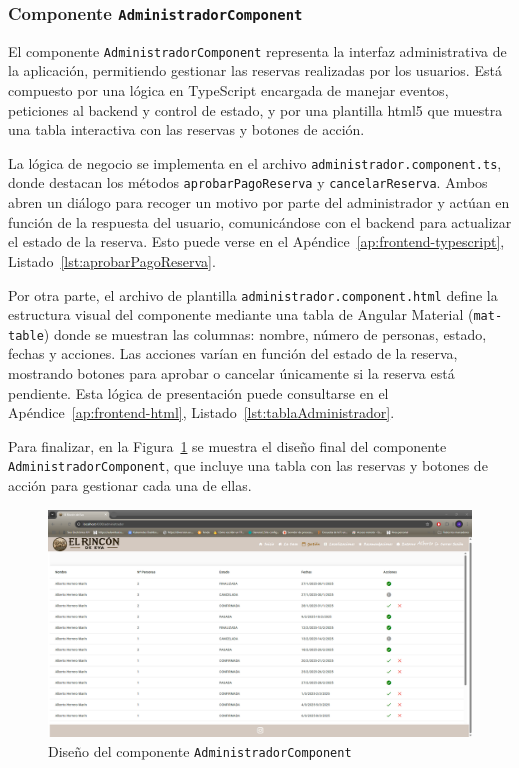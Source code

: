 \subsubsection{Componente \texttt{AdministradorComponent}}

El componente \texttt{AdministradorComponent} representa la interfaz administrativa de la aplicación, permitiendo gestionar las reservas realizadas por los usuarios. Está compuesto por una lógica en TypeScript encargada de manejar eventos, peticiones al backend y control de estado, y por una plantilla \gls{html5} que muestra una tabla interactiva con las reservas y botones de acción.

La lógica de negocio se implementa en el archivo \texttt{administrador.component.ts}, donde destacan los métodos \texttt{aprobarPagoReserva} y \texttt{cancelarReserva}. Ambos abren un diálogo para recoger un motivo por parte del administrador y actúan en función de la respuesta del usuario, comunicándose con el backend para actualizar el estado de la reserva. Esto puede verse en el Apéndice~\ref{ap:frontend-typescript}, Listado~\ref{lst:aprobarPagoReserva}.

Por otra parte, el archivo de plantilla \texttt{administrador.component.html} define la estructura visual del componente mediante una tabla de Angular Material (\texttt{mat-table}) donde se muestran las columnas: nombre, número de personas, estado, fechas y acciones. Las acciones varían en función del estado de la reserva, mostrando botones para aprobar o cancelar únicamente si la reserva está pendiente. Esta lógica de presentación puede consultarse en el Apéndice~\ref{ap:frontend-html}, Listado~\ref{lst:tablaAdministrador}.

Para finalizar, en la Figura~\ref{fig:administrador_component} se muestra el diseño final del componente \\ \texttt{AdministradorComponent}, que incluye una tabla con las reservas y botones de acción para gestionar cada una de ellas.

\begin{figure}[h!tb]
    \centering
    \includegraphics[width=1\textwidth]{figs/administrador.png}
    \caption{Diseño del componente \texttt{AdministradorComponent}}
    \label{fig:administrador_component}
\end{figure}

